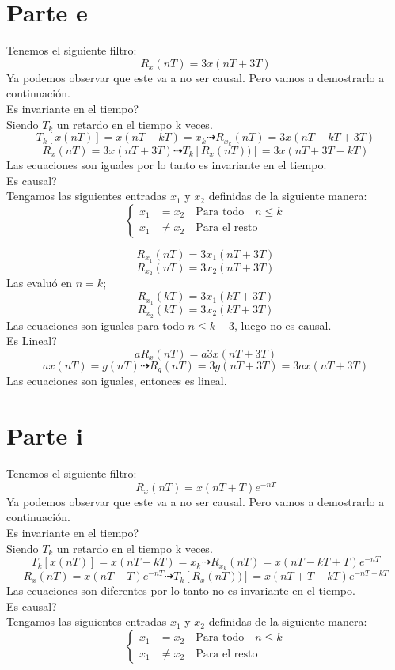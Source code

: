 \documentclass{report}
\begin{document}
\section{Parte e}
Tenemos el siguiente filtro:
$$R_x(nT) = 3x(nT+3T)$$
Ya podemos observar que este va a no ser causal. Pero vamos a demostrarlo a continuaci\'on.\\
Es invariante en el tiempo?\\
Siendo $T_k$ un retardo en el tiempo k veces.\\
$$T_k[x(nT)] = x(nT-kT) = x_k\dashrightarrow R_{x_{k}}(nT) = 3x(nT-kT+3T)$$
$$R_x(nT) = 3x(nT+3T)\dashrightarrow T_k[R_x(nT))] = 3x(nT+3T-kT)$$
Las ecuaciones son iguales por lo tanto es invariante en el tiempo.\\
Es causal?\\
Tengamos las siguientes entradas $x_1$ y $x_2$ definidas de la siguiente manera:\\
\begin{equation*}
\left\{
\begin{aligned}
x_1 & = x_2 \quad\text{Para todo}\quad n\leq k\\
x_1 & \neq x_2 \quad\text{Para el resto}
\end{aligned}
\right.
\end{equation*}

$$R_{x_{1}}(nT) = 3x_1(nT+3T)$$
$$R_{x_{2}}(nT) = 3x_2(nT+3T)$$
Las evalu\'o en $n=k$;\\
$$R_{x_{1}}(kT) = 3x_1(kT+3T)$$
$$R_{x_{2}}(kT) = 3x_2(kT+3T)$$
Las ecuaciones son iguales para todo $n\leq k-3$, luego no es causal.\\
Es Lineal?\\
$$aR_x(nT) = a3x(nT+3T)$$
$$ax(nT)=g(nT)\dashrightarrow R_g(nT) = 3g(nT+3T) = 3ax(nT+3T) $$
Las ecuaciones son iguales, entonces es lineal.\\

\section{Parte i}
Tenemos el siguiente filtro:
$$R_x(nT) = x(nT+T)e^{-nT}$$
Ya podemos observar que este va a no ser causal. Pero vamos a demostrarlo a continuaci\'on.\\
Es invariante en el tiempo?\\
Siendo $T_k$ un retardo en el tiempo k veces.\\
$$T_k[x(nT)] = x(nT-kT) = x_k\dashrightarrow R_{x_{k}}(nT) = x(nT-kT+T)e^{-nT}$$
$$R_x(nT) = x(nT+T)e^{-nT}\dashrightarrow T_k[R_x(nT))] = x(nT+T-kT)e^{-nT+kT}$$
Las ecuaciones son diferentes por lo tanto no es invariante en el tiempo.\\
Es causal?\\
Tengamos las siguientes entradas $x_1$ y $x_2$ definidas de la siguiente manera:\\
\begin{equation*}
\left\{
\begin{aligned}
x_1 & = x_2 \quad\text{Para todo}\quad n\leq k\\
x_1 & \neq x_2 \quad\text{Para el resto}
\end{aligned}
\right.
\end{equation*}
\end{document}

